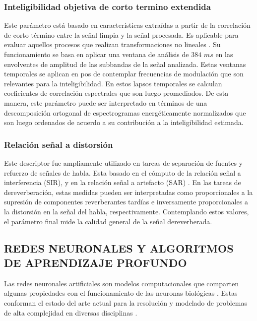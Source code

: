 \subsubsection{Inteligibilidad objetiva de corto termino extendida}
Este parámetro está basado en características extraídas a partir de la correlación de corto término entre la señal limpia y la señal procesada. Es aplicable para evaluar aquellos procesos que realizan transformaciones no lineales \cite{ESTOI}. Su funcionamiento se basa en aplicar una ventana de análisis de $384$ $ms$ en las envolventes de amplitud de las subbandas de la señal analizada. Estas ventanas temporales se aplican en pos de contemplar frecuencias de modulación que son relevantes para la inteligibilidad. En estos lapsos temporales se calculan coeficientes de correlación espectrales que son luego promediados. De esta manera, este parámetro puede ser interpretado en términos de una descomposición ortogonal de espectrogramas energéticamente normalizados que son luego ordenados de acuerdo a su contribución a la inteligibilidad estimada. 

\subsubsection{Relación señal a distorsión}

Este descriptor fue ampliamente utilizado en tareas de separación de fuentes y refuerzo de señales de habla. Esta basado en el cómputo de la relación señal a interferencia (SIR), y en la relación señal a artefacto (SAR) \cite{SAR}. En las tareas de dereverberación, estas medidas pueden ser interpretadas como proporcionales a la supresión de componentes reverberantes tardías e inversamente proporcionales a la distorsión en la señal del habla, respectivamente. Contemplando estos valores, el parámetro final mide la calidad general de la señal dereverberada.  

\subsection[Redes neuronales y algoritmos de aprendizaje profundo]{REDES NEURONALES Y ALGORITMOS DE APRENDIZAJE PROFUNDO}
Las redes neuronales artificiales son modelos computacionales que comparten algunas propiedades con el funcionamiento de las neuronas biológicas  \cite{neurona}. Estas conforman el estado del arte actual para la resolución y modelado de problemas de alta complejidad en diversas disciplinas \cite{ANN_intro}. 

